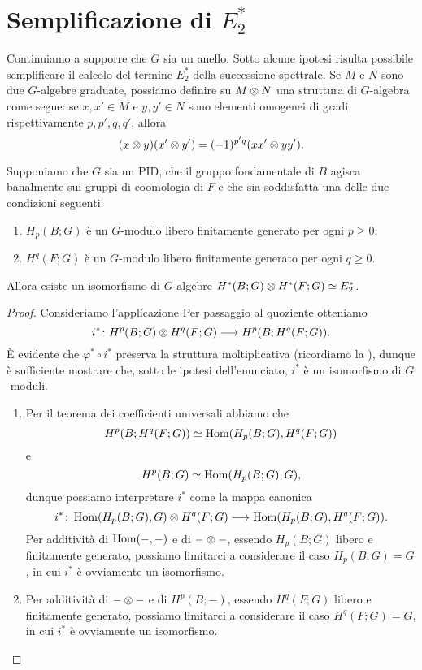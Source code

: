 \section{Semplificazione di \texorpdfstring{$E^*_2$}{E*2}}
Continuiamo a supporre che $G$ sia un anello. Sotto alcune ipotesi risulta possibile semplificare il calcolo del termine $E^\ast_2$ della successione spettrale. Se $M$ e $N$ sono due $G$-algebre graduate, possiamo definire su $M\mathbin{\otimes} N$ una struttura di $G$-algebra come segue: se $x,x'\in M$ e $y,y'\in N$ sono elementi omogenei di gradi, rispettivamente $p,p',q,q'$, allora
$$
(x\mathbin{\otimes} y)(x'\mathbin{\otimes} y')=(-1)^{p'q}(xx'\mathbin{\otimes} yy').
$$
\begin{proposition}
Supponiamo che $G$ sia un PID, che il gruppo fondamentale di $B$ agisca banalmente sui gruppi di coomologia di $F$ e che sia soddisfatta una delle due condizioni seguenti:
\begin{enumerate}
\item $H_p(B;G)$ è un $G$-modulo libero finitamente generato per ogni $p\ge 0$;
\item $H^q(F;G)$ è un $G$-modulo libero finitamente generato per ogni $q\ge 0$.
\end{enumerate}
Allora esiste un isomorfismo di $G$-algebre $H^*(B;G)\mathbin{\otimes} H^*(F;G)\simeq E^\ast_2$.
\end{proposition}
\begin{proof}
Consideriamo l'applicazione
Per passaggio al quoziente otteniamo
$$
\map{i^*}{H^p(B;G)\tensor H^q(F;G)}{H^p(B;H^q(F;G))}.
$$
È evidente che $\varphi^*\circ i^*$ preserva la struttura moltiplicativa (ricordiamo la ), dunque è sufficiente mostrare che, sotto le ipotesi dell'enunciato, $i^*$ è un isomorfismo di $G$-moduli.
\begin{enumerate}
\item Per il teorema dei coefficienti universali abbiamo che
$$
H^p(B;H^q(F;G))\simeq\operatorname{Hom}(H_p(B;G),H^q(F;G))
$$
e
$$
H^p(B;G)\simeq\operatorname{Hom}(H_p(B;G),G),
$$
dunque possiamo interpretare $i^*$ come la mappa canonica
$$
\map{i^*}{\Hom(H_p(B;G),G)\tensor H^q(F;G)}{\Hom(H_p(B;G),H^q(F;G))}.
$$
Per additività di $\operatorname{Hom}(-,-)$ e di $-\mathbin{\otimes}-$, essendo $H_p(B;G)$ libero e finitamente generato, possiamo limitarci a considerare il caso $H_p(B;G)=G$, in cui $i^*$ è ovviamente un isomorfismo.
\item Per additività di $-\mathbin{\otimes}-$ e di $H^p(B;-)$, essendo $H^q(F;G)$ libero e finitamente generato, possiamo limitarci a considerare il caso $H^q(F;G)=G$, in cui $i^*$ è ovviamente un isomorfismo.\qedhere
\end{enumerate}
\end{proof}

